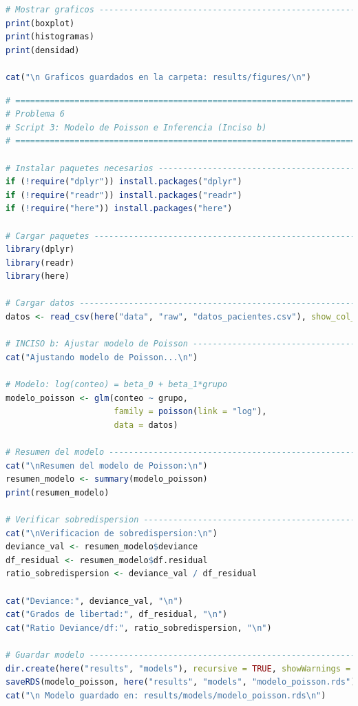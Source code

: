 \begin{lstlisting}[language=R, caption={Script 2: Analisis Exploratorio - Comparacion Grafica (Inciso a).}, label={lst:script3}]
# Mostrar graficos ------------------------------------------------------------
print(boxplot)
print(histogramas)
print(densidad)

cat("\n Graficos guardados en la carpeta: results/figures/\n")
\end{lstlisting}

\clearpage %

\begin{lstlisting}[language=R, caption={Script 3: Modelo de Poisson e Inferencia (Inciso b).}, label={lst:script4}]
# =============================================================================
# Problema 6
# Script 3: Modelo de Poisson e Inferencia (Inciso b)
# =============================================================================

# Instalar paquetes necesarios ------------------------------------------------
if (!require("dplyr")) install.packages("dplyr")
if (!require("readr")) install.packages("readr")
if (!require("here")) install.packages("here")

# Cargar paquetes -------------------------------------------------------------
library(dplyr)
library(readr)
library(here)

# Cargar datos ----------------------------------------------------------------
datos <- read_csv(here("data", "raw", "datos_pacientes.csv"), show_col_types = FALSE)

# INCISO b: Ajustar modelo de Poisson -----------------------------------------
cat("Ajustando modelo de Poisson...\n")

# Modelo: log(conteo) = beta_0 + beta_1*grupo
modelo_poisson <- glm(conteo ~ grupo, 
                      family = poisson(link = "log"),
                      data = datos)

# Resumen del modelo ----------------------------------------------------------
cat("\nResumen del modelo de Poisson:\n")
resumen_modelo <- summary(modelo_poisson)
print(resumen_modelo)

# Verificar sobredispersion ---------------------------------------------------
cat("\nVerificacion de sobredispersion:\n")
deviance_val <- resumen_modelo$deviance
df_residual <- resumen_modelo$df.residual
ratio_sobredispersion <- deviance_val / df_residual

cat("Deviance:", deviance_val, "\n")
cat("Grados de libertad:", df_residual, "\n")
cat("Ratio Deviance/df:", ratio_sobredispersion, "\n")

# Guardar modelo --------------------------------------------------------------
dir.create(here("results", "models"), recursive = TRUE, showWarnings = FALSE)
saveRDS(modelo_poisson, here("results", "models", "modelo_poisson.rds"))
cat("\n Modelo guardado en: results/models/modelo_poisson.rds\n")


\end{lstlisting}
